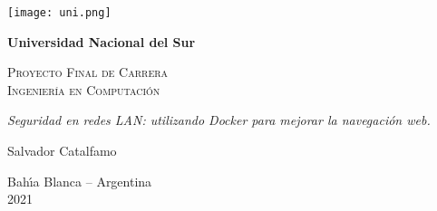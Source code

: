 \begin{titlepage}

\begin{center}
\texttt{[image: uni.png]}
\end{center}

\begin{center}

\textbf{\LARGE Universidad Nacional del Sur}\\

\vspace{2cm}

\textsc{\LARGE Proyecto Final de Carrera}\\ \vspace{.1cm}
\textsc{\LARGE Ingenier\'ia en Computaci\'on}\\


\vspace{4cm}

\emph{\LARGE Seguridad en redes LAN: utilizando Docker para mejorar la navegación web.}\\

\vspace{2.5cm}

{\Large Salvador Catalfamo}\\

\vspace{2.5cm}

{\sc\Large Bah\'{\i}a Blanca -- Argentina}\\
\vspace*{.1cm} {\Large 2021}

\end{center}
\end{titlepage}
